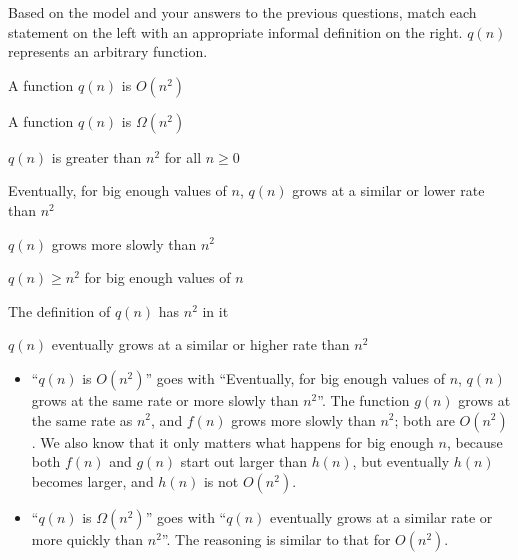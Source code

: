 \documentclass{tufte-handout}
\begin{document}
\begin{questions}
\newpage
\item \label{q:synthesize} Based on the model and your answers to the
  previous questions, match each statement on the left with an
  appropriate informal definition on the right. $q(n)$ represents an
  arbitrary function.  \bigskip

  \begin{fullwidth}
  \begin{center}
  \begin{minipage}{0.4\linewidth}
    A function $q(n)$ is $O(n^2)$ \bigskip

    A function $q(n)$ is $\Omega(n^2)$
  \end{minipage}
  \begin{minipage}{0.4\linewidth}
     $q(n)$ is greater than $n^2$ for all $n \geq 0$ \bigskip

     Eventually, for big enough values of $n$, $q(n)$ grows at
      a similar or lower rate than $n^2$ \bigskip

     $q(n)$ grows more slowly than $n^2$ \bigskip

     $q(n) \geq n^2$ for big enough values of $n$ \bigskip

     The definition of $q(n)$ has $n^2$ in it \bigskip

    $q(n)$ eventually grows at a similar or higher rate
      than $n^2$
  \end{minipage}
  \end{center}
  \end{fullwidth}

  \begin{answer}
    \begin{itemize}
    \item ``$q(n)$ is $O(n^2)$'' goes with ``Eventually, for big enough
      values of $n$, $q(n)$ grows at the same rate or more slowly than
      $n^2$''.  The function $g(n)$ grows at the same rate as $n^2$,
      and $f(n)$ grows more slowly than $n^2$; both are $O(n^2)$.  We
      also know that it only matters what happens for big enough $n$,
      because both $f(n)$ and $g(n)$ start out larger than $h(n)$, but
      eventually $h(n)$ becomes larger, and $h(n)$ is not $O(n^2)$.
    \item ``$q(n)$ is $\Omega(n^2)$'' goes with ``$q(n)$ eventually
      grows at a similar rate or more quickly than $n^2$''.  The
      reasoning is similar to that for $O(n^2)$.
    \end{itemize}
  \end{answer}


\end{questions}
\end{document}
